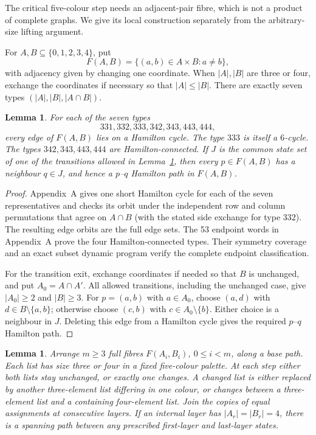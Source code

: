 \documentclass[11pt]{article}
\newtheorem{lemma}[theorem]{Lemma}
\theoremstyle{remark}
\numberwithin{equation}{section}
\numberwithin{table}{section}
\begin{document}
The critical five-colour step needs an adjacent-pair fibre, which is
not a product of complete graphs.  We give its local construction separately
from the arbitrary-size lifting argument.

For $A,B\subseteq\{0,1,2,3,4\}$, put
\[
 F(A,B)=\{(a,b)\in A\times B:a\ne b\},
\]
with adjacency given by changing one coordinate.  When $|A|,|B|$ are
three or four, exchange the coordinates if necessary so that
$|A|\le|B|$.  There are exactly seven types
$(|A|,|B|,|A\cap B|)$.

\begin{lemma}
\label{lem:pair-five-endpoints}
For each of the seven types
\[
331,332,333,342,343,443,444,
\]
every edge of $F(A,B)$ lies on a Hamilton cycle.  The type $333$ is
itself a $6$-cycle.  The types $342,343,443,444$ are
Hamilton-connected.  If $J$ is the common state set of one of the
transitions allowed in Lemma~\ref{lem:pair-five-reset}, then every
$p\in F(A,B)$ has a neighbour $q\in J$, and hence a $p$--$q$
Hamilton path in $F(A,B)$.
\end{lemma}

\begin{proof}
Appendix~A gives one short Hamilton cycle for each of
the seven representatives and checks its orbit under the independent
row and column permutations that agree on $A\cap B$ (with the stated
side exchange for type $332$).  The resulting edge orbits are the full
edge sets.  The 53 endpoint words in Appendix~A prove the four
Hamilton-connected types. Their symmetry coverage and an exact subset
dynamic program verify the complete endpoint classification.

For the transition exit, exchange coordinates if needed so that
$B$ is unchanged, and put $A_0=A\cap A'$. All allowed transitions,
including the unchanged case, give $|A_0|\ge2$ and $|B|\ge3$.
For $p=(a,b)$ with $a\in A_0$, choose $(a,d)$ with
$d\in B\setminus\{a,b\}$; otherwise choose $(c,b)$ with
$c\in A_0\setminus\{b\}$. Either choice is a neighbour in $J$.
Deleting this edge from a Hamilton cycle gives the required
$p$--$q$ Hamilton path.
\end{proof}


\begin{lemma}
\label{lem:pair-five-reset}
Arrange $m\ge3$ full fibres $F(A_i,B_i)$, $0\le i<m$, along a
base path.  Each list has size three or four in a fixed five-colour palette.  At each step either
both lists stay unchanged, or exactly one changes. A changed list
is either replaced by another three-element list differing in one
colour, or changes between a three-element list and a containing
four-element list.
Join the copies of equal assignments at consecutive layers.  If an
internal layer has $|A_r|=|B_r|=4$, there is a spanning path between
any prescribed first-layer and last-layer states.
\end{lemma}
\end{document}
